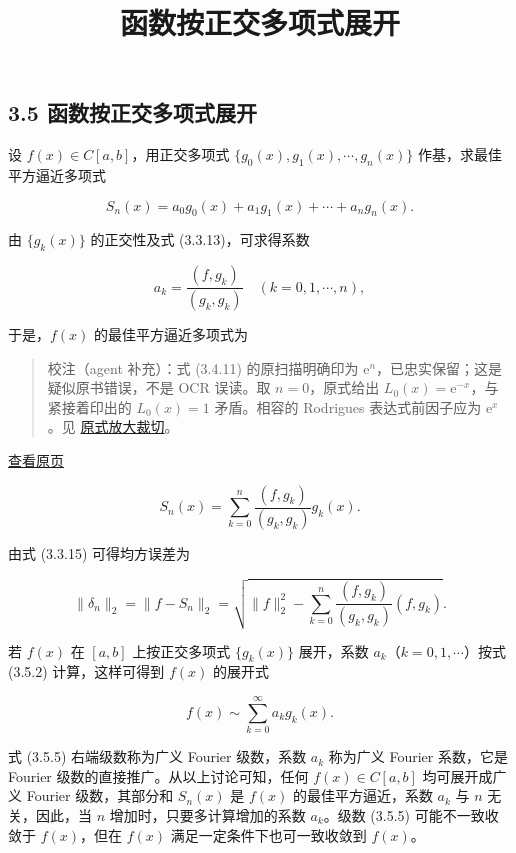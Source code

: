\documentclass[
  10pt,
  fontset=fandol]{ctexart}
\title{函数按正交多项式展开}
\author{}
\date{}
\begin{document}
\maketitle

\subsection{3.5 函数按正交多项式展开}\label{ux51fdux6570ux6309ux6b63ux4ea4ux591aux9879ux5f0fux5c55ux5f00}

设 \(f(x)\in C[a,b]\)，用正交多项式 \(\{g_0(x),g_1(x),\cdots,g_n(x)\}\) 作基，求最佳平方逼近多项式

\[
S_n(x)=a_0g_0(x)+a_1g_1(x)+\cdots+a_ng_n(x).\tag{3.5.1}
\]

由 \(\{g_k(x)\}\) 的正交性及式 (3.3.13)，可求得系数

\[
a_k=\frac{(f,g_k)}{(g_k,g_k)}\quad(k=0,1,\cdots,n),\tag{3.5.2}
\]

于是，\(f(x)\) 的最佳平方逼近多项式为

\begin{quote}
校注（agent 补充）：式 (3.4.11) 的原扫描明确印为 \(\mathrm e^n\)，已忠实保留；这是疑似原书错误，不是 OCR 误读。取 \(n=0\)，原式给出 \(L_0(x)=\mathrm e^{-x}\)，与紧接着印出的 \(L_0(x)=1\) 矛盾。相容的 Rodrigues 表达式前因子应为 \(\mathrm e^x\)。见 \href{../assets/ch03b/p076-laguerre-formula.png}{原式放大裁切}。
\end{quote}

\href{../../source-images/pdf-077.jpeg}{查看原页}

\[
S_n(x)=\sum_{k=0}^n\frac{(f,g_k)}{(g_k,g_k)}g_k(x).\tag{3.5.3}
\]

由式 (3.3.15) 可得均方误差为

\[
\|\delta_n\|_2=\|f-S_n\|_2=\sqrt{\|f\|_2^2-\sum_{k=0}^n\frac{(f,g_k)}{(g_k,g_k)}(f,g_k)}.\tag{3.5.4}
\]

若 \(f(x)\) 在 \([a,b]\) 上按正交多项式 \(\{g_k(x)\}\) 展开，系数 \(a_k\)（\(k=0,1,\cdots\)）按式 (3.5.2) 计算，这样可得到 \(f(x)\) 的展开式

\[
f(x)\sim\sum_{k=0}^\infty a_kg_k(x).\tag{3.5.5}
\]

式 (3.5.5) 右端级数称为广义 Fourier 级数，系数 \(a_k\) 称为广义 Fourier 系数，它是 Fourier 级数的直接推广。从以上讨论可知，任何 \(f(x)\in C[a,b]\) 均可展开成广义 Fourier 级数，其部分和 \(S_n(x)\) 是 \(f(x)\) 的最佳平方逼近，系数 \(a_k\) 与 \(n\) 无关，因此，当 \(n\) 增加时，只要多计算增加的系数 \(a_k\)。级数 (3.5.5) 可能不一致收敛于 \(f(x)\)，但在 \(f(x)\) 满足一定条件下也可一致收敛到 \(f(x)\)。
\end{document}
